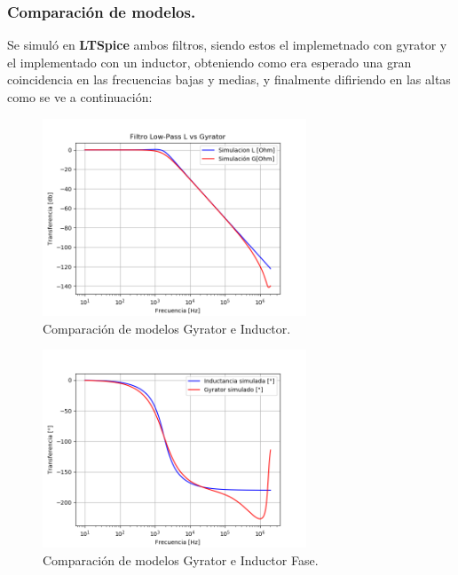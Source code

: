 \documentclass[a4paper]{article}
\begin{document}
\subsubsection{Comparación de modelos.}
Se simuló en \textbf{LTSpice} ambos filtros, siendo estos el implemetnado con gyrator y el implementado con un inductor, obteniendo como era esperado una gran coincidencia en las frecuencias bajas y medias, y finalmente difiriendo en las altas como se ve a continuación:
\begin{figure}[H]	
	\centering
	\includegraphics[width=0.7\textwidth]{ImagenesEj2/simLP.PNG}
	\caption{Comparación de modelos Gyrator e Inductor.}
	\label{fig:gyrIndL}
\end{figure}
\begin{figure}[H]	
	\centering
	\includegraphics[width=0.7\textwidth]{ImagenesEj2/simLPP.PNG}
	\caption{Comparación de modelos Gyrator e Inductor Fase.}
	\label{fig:gyrIndPL}
\end{figure}
\end{document}
